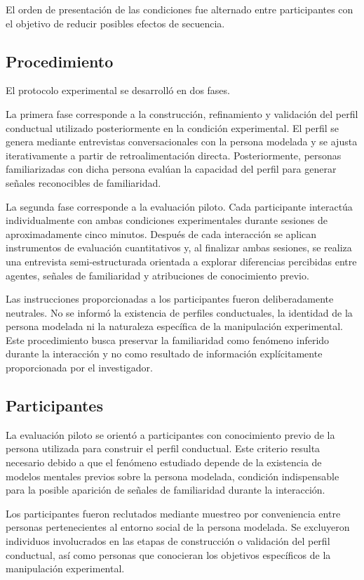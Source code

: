 \documentclass[sigconf, nonacm, language=spanish]{acmart}
\begin{document}
El orden de presentación de las condiciones fue alternado entre participantes con el objetivo de reducir posibles efectos de secuencia.

\subsection{Procedimiento}

El protocolo experimental se desarrolló en dos fases.

La primera fase corresponde a la construcción, refinamiento y validación del perfil conductual utilizado posteriormente en la condición experimental. El perfil se genera mediante entrevistas conversacionales con la persona modelada y se ajusta iterativamente a partir de retroalimentación directa. Posteriormente, personas familiarizadas con dicha persona evalúan la capacidad del perfil para generar señales reconocibles de familiaridad.

La segunda fase corresponde a la evaluación piloto. Cada participante interactúa individualmente con ambas condiciones experimentales durante sesiones de aproximadamente cinco minutos. Después de cada interacción se aplican instrumentos de evaluación cuantitativos y, al finalizar ambas sesiones, se realiza una entrevista semi-estructurada orientada a explorar diferencias percibidas entre agentes, señales de familiaridad y atribuciones de conocimiento previo.

Las instrucciones proporcionadas a los participantes fueron deliberadamente neutrales. No se informó la existencia de perfiles conductuales, la identidad de la persona modelada ni la naturaleza específica de la manipulación experimental. Este procedimiento busca preservar la familiaridad como fenómeno inferido durante la interacción y no como resultado de información explícitamente proporcionada por el investigador.

\subsection{Participantes}

La evaluación piloto se orientó a participantes con conocimiento previo de la persona utilizada para construir el perfil conductual. Este criterio resulta necesario debido a que el fenómeno estudiado depende de la existencia de modelos mentales previos sobre la persona modelada, condición indispensable para la posible aparición de señales de familiaridad durante la interacción.

Los participantes fueron reclutados mediante muestreo por conveniencia entre personas pertenecientes al entorno social de la persona modelada. Se excluyeron individuos involucrados en las etapas de construcción o validación del perfil conductual, así como personas que conocieran los objetivos específicos de la manipulación experimental.
\end{document}
